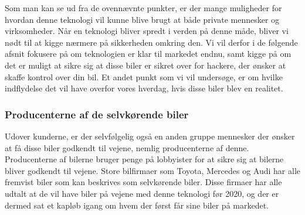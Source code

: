 Som man kan se ud fra de ovennævnte punkter, er der mange muligheder for hvordan denne teknologi vil kunne blive brugt at både private mennesker og virksomheder. Når en teknologi bliver spredt i verden på denne måde, bliver vi nødt til at kigge nærmere på sikkerheden omkring den. Vi vil derfor i de følgende afsnit fokusere på om teknologien er klar til markedet endnu, samt kigge på om det er muligt at sikre sig at disse biler er sikret over for hackere, der ønsker at skaffe kontrol over din bil. Et andet punkt som vi vil undersøge, er om hvilke indflydelse det vil have overfor vores hverdag, hvis disse biler blev en realitet.

\subsubsection{Producenterne af de selvkørende biler}
Udover kunderne, er der selvfølgelig også en anden gruppe mennesker der ønsker at få disse biler godkendt til vejene, nemlig producenterne af denne. Producenterne af bilerne bruger penge på lobbyister for at sikre sig at bilerne bliver godkendt til vejene\cite{soprweb}. Store bilfirmaer som Toyota, Mercedes og Audi har alle fremvist biler \cite{PopularMechanics} som kan beskrives som selvkørende biler. Disse firmaer har alle udtalt at de vil have biler på vejene med denne teknologi før 2020, og der er dermed sat et kapløb igang om hvem der først får sine biler på markedet. 
